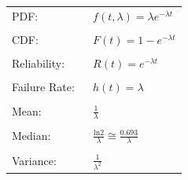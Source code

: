 \documentclass[12pt]{article}
\begin{document}
\pagestyle{empty}
\Large
{}
\pagecolor{ehandbook}

\bf
\boldmath

\begin{tabular}{ll}
PDF:                 & $\displaystyle{ f(t, \lambda) = \lambda e^{-\lambda t}}$ \\
                       & \\
CDF:                 & $\displaystyle{ F(t) = 1-e^{-\lambda t}}$ \\
                     & \\
Reliability:         & $\displaystyle{R(t) = e^{-\lambda t}}$ \\
                     & \\
Failure Rate: \,\,   & $ h(t) = \lambda $ \\
                     & \\
Mean:                & $\displaystyle{\frac{1}{\lambda}}$ \\
                     & \\
Median:             & $\displaystyle{\frac{\mbox{ln} 2}{\lambda} \cong \frac{0.693}{\lambda}}$ \\
                       & \\
Variance:            & $\displaystyle{\frac{1}{\lambda^2}}$ 
\end{tabular}
 
 
\end{document}
